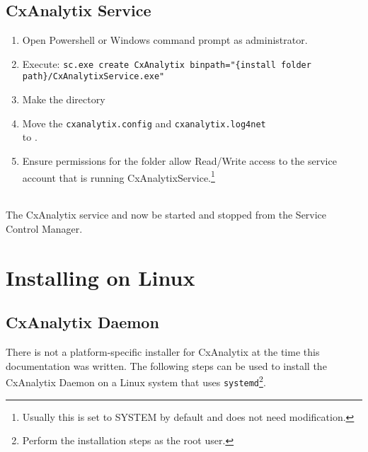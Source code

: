 \subsection{CxAnalytix Service}
\begin{enumerate}
    \item Open Powershell or Windows command prompt as administrator.
    \item Execute: \texttt{sc.exe create CxAnalytix binpath="\{install folder path\}/CxAnalytixService.exe"}
    \item Make the directory \texttt{\windowsconfigpathbase}
    \item Move the \texttt{cxanalytix.config} and \texttt{cxanalytix.log4net} \\to \windowsconfigpathbase.
    \item Ensure permissions for the folder \texttt{\windowsconfigpathbase} allow Read/Write access to the service account that is running
    CxAnalytixService.\footnote{Usually this is set to SYSTEM by default and does not need modification.}
\end{enumerate}



\noindent\\The CxAnalytix service and now be started and stopped from the Service Control Manager.


\section{Installing on Linux}

\subsection{CxAnalytix Daemon}
There is not a platform-specific installer for CxAnalytix at the time this documentation was written. The following steps can 
be used to install the CxAnalytix Daemon on a Linux system that uses \verb|systemd|\footnote{Perform the installation steps as the root user.}.


